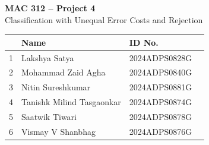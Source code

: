 \documentclass[11pt,a4paper]{article}
\begin{document}
\begin{center}
{\LARGE\bfseries MAC 312 -- Project 4}\\[4pt]
{\Large Classification with Unequal Error Costs and Rejection}\\[10pt]
\footnotesize
\begin{tabular}{clll}
\toprule
& Name & ID No. \\
\midrule
1 & Lakshya Satya             & 2024ADPS0828G \\
2 & Mohammad Zaid Agha        & 2024ADPS0840G \\
3 & Nitin Sureshkumar         & 2024ADPS0881G  \\
4 & Tanishk Milind Tasgaonkar & 2024ADPS0874G \\
5 & Saatwik Tiwari            & 2024ADPS0878G \\

6 & Vismay V Shanbhag         & 2024ADPS0876G   \\
\bottomrule
\end{tabular}
\end{center}




\nocite{spambase}


\end{document}
